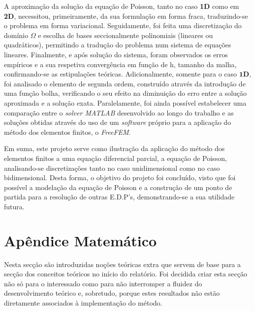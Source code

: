 \documentclass{article}
\theoremstyle{definition}
\theoremstyle{plain}
\numberwithin{equation}{section}
\newcommand{\tab}{\hspace{10mm}}
\begin{document}
\tab A aproximação da solução da equação de Poisson, tanto no caso \textbf{1D} como em \textbf{2D}, necessitou, primeiramente, da sua formulação em forma fraca, traduzindo-se o problema em forma variacional. Seguidamente, foi feita uma discretização do domínio $\Omega$ e escolha de bases seccionalmente polinomiais (lineares ou quadráticos), permitindo a tradução do problema num sistema de equações lineares. Finalmente, e após solução do sistema, foram observados os erros empíricos e a sua   respetiva convergência em função de h, tamanho da malha, confirmando-se as estipulações teóricas. Adicionalmente, somente para o caso $\textbf{1D}$, foi analisado o elemento de segunda ordem, construído através da introdução de uma função bolha, verificando o seu efeito na diminuição do erro entre a solução aproximada e a solução exata. Paralelamente, foi ainda possível estabelecer uma comparação entre o \emph{solver MATLAB}  desenvolvido ao longo do trabalho e as soluções obtidas através do uso de um \emph{software} próprio para a aplicação do método dos elementos finitos, o \emph{FreeFEM}.

\tab Em suma, este projeto serve como ilustração da aplicação do método dos elementos finitos a uma equação diferencial parcial, a equação de Poisson, analisando-se discretizações tanto no caso unidimensional como no caso bidimensional. Desta forma, o objetivo do projeto foi concluído, visto que foi possível a modelação da equação de Poisson e a construção de um ponto de partida para a resolução de outras E.D.P's, demonstrando-se a sua utilidade futura.



\section{Apêndice Matemático}
\tab Nesta secção são introduzidas noções teóricas extra que servem de base para a secção dos conceitos teóricos no início do relatório. Foi decidida criar esta secção não só para o interessado como para não interromper a fluidez do desenvolvimento teórico e, sobretudo, porque estes resultados não estão diretamente associados à implementação do método.
    
\end{document}

